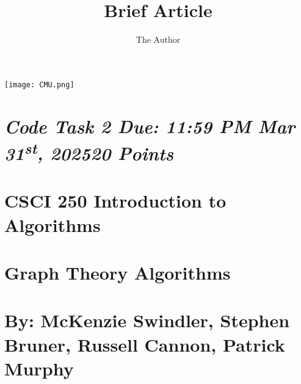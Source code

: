 \documentclass{article}
\title{Brief Article}
\author{The Author}
\begin{document}
\begin{minipage}{\linewidth}
  \centering
 
\texttt{[image: CMU.png]}
  \section*{\emph{\bf Code Task 2 \hspace{0.2 cm} Due: 11:59 PM Mar 31\textsuperscript{st}, 2025\hspace{0.2cm}20 Points}}
  \section*{CSCI 250 Introduction to Algorithms}
  \section*{Graph Theory Algorithms}
  \section*{By: McKenzie Swindler, Stephen Bruner, Russell Cannon, Patrick Murphy\newline}

\end{minipage}
\end{document}
